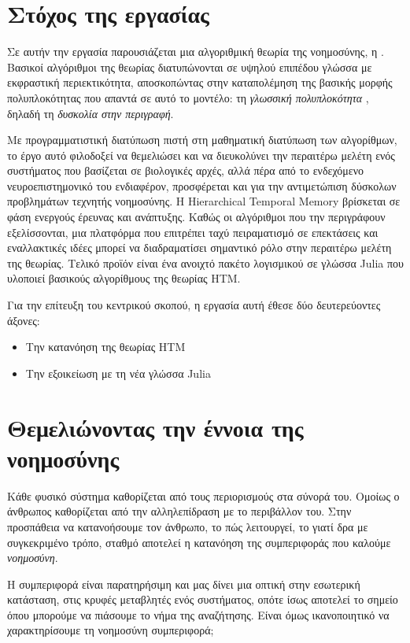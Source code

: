 \section{Στόχος της εργασίας}

  Σε αυτήν την εργασία παρουσιάζεται μια αλγοριθμική θεωρία της νοημοσύνης, η
  .
  Βασικοί αλγόριθμοι της θεωρίας διατυπώνονται σε υψηλού επιπέδου γλώσσα με εκφραστική περιεκτικότητα,
  αποσκοπώντας στην καταπολέμηση της βασικής μορφής πολυπλοκότητας που απαντά σε αυτό το μοντέλο:
  τη \textit{γλωσσική πολυπλοκότητα} \parencite{chazelleNaturalAlgorithmsInfluence2012}, δηλαδή τη \textit{δυσκολία στην περιγραφή}.

  Με προγραμματιστική διατύπωση πιστή στη μαθηματική διατύπωση των αλγορίθμων, το έργο αυτό φιλοδοξεί να θεμελιώσει και να
  διευκολύνει την περαιτέρω μελέτη ενός συστήματος που βασίζεται σε βιολογικές αρχές,
  αλλά πέρα από το ενδεχόμενο νευροεπιστημονικό του ενδιαφέρον,
  προσφέρεται και για την αντιμετώπιση δύσκολων προβλημάτων τεχνητής νοημοσύνης.
  Η Hierarchical Temporal Memory βρίσκεται σε φάση ενεργούς έρευνας και ανάπτυξης.
  Καθώς οι αλγόριθμοι που την περιγράφουν εξελίσσονται, μια πλατφόρμα που επιτρέπει ταχύ πειραματισμό σε επεκτάσεις και εναλλακτικές ιδέες
  μπορεί να διαδραματίσει σημαντικό ρόλο στην περαιτέρω μελέτη της θεωρίας.
  Τελικό προϊόν είναι ένα ανοιχτό πακέτο λογισμικού σε γλώσσα Julia που υλοποιεί βασικούς αλγορίθμους της θεωρίας HTM.

  Για την επίτευξη του κεντρικού σκοπού, η εργασία αυτή έθεσε δύο δευτερεύοντες άξονες:
  \begin{itemize}
    \item Την κατανόηση της θεωρίας HTM
    \item Την εξοικείωση με τη νέα γλώσσα Julia
  \end{itemize}


\section{Θεμελιώνοντας την έννοια της νοημοσύνης}

  Κάθε φυσικό σύστημα καθορίζεται από τους περιορισμούς στα σύνορά του.
  Ομοίως ο άνθρωπος καθορίζεται από την αλληλεπίδραση με το περιβάλλον του.
  Στην προσπάθεια να κατανοήσουμε τον άνθρωπο, το πώς λειτουργεί, το γιατί δρα με συγκεκριμένο τρόπο,
  σταθμό αποτελεί η κατανόηση της συμπεριφοράς που καλούμε \textit{νοημοσύνη}.

  Η συμπεριφορά είναι παρατηρήσιμη και μας δίνει μια οπτική στην εσωτερική κατάσταση, στις κρυφές μεταβλητές ενός συστήματος,
  οπότε ίσως αποτελεί το σημείο όπου μπορούμε να πιάσουμε το νήμα της αναζήτησης.
  Είναι όμως ικανοποιητικό να χαρακτηρίσουμε τη νοημοσύνη συμπεριφορά;

